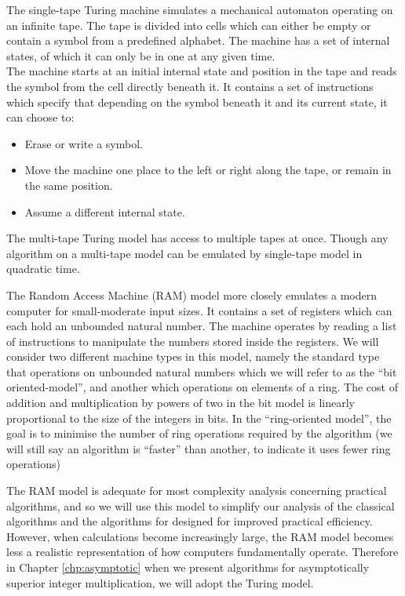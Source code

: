 The single-tape Turing machine simulates a mechanical automaton operating on an infinite tape. The tape is divided into cells which can either be empty or contain a symbol from a predefined alphabet. The machine has a set of internal states, of which it can only be in one at any given time.\\
The machine starts at an initial internal state and position in the tape and reads the symbol from the cell directly beneath it. It contains a set of instructions which specify that depending on the symbol beneath it and its current state, it can choose to:
\begin{itemize}
    \item Erase or write a symbol.
    \item Move the machine one place to the left or right along the tape, or remain in the same position.
    \item Assume a different internal state.
\end{itemize}
The multi-tape Turing model has access to multiple tapes at once. Though any algorithm on a multi-tape model can be emulated by single-tape model in quadratic time\cite{comp-compexity}.

The Random Access Machine (RAM) model more closely emulates a modern computer for small-moderate input sizes. It contains a set of registers which can each hold an unbounded natural number. The machine operates by reading a list of instructions to manipulate the numbers stored inside the registers. We will consider two different machine types in this model, namely the standard type that operations on unbounded natural numbers which we will refer to as the ``bit oriented-model'', and another which operations on elements of a ring. The cost of addition and multiplication by powers of two in the bit model is linearly proportional to the size of the integers in bits. In the ``ring-oriented model'',  the goal is to minimise the number of ring operations required by the algorithm (we will still say an algorithm is ``faster'' than another, to indicate it uses fewer ring operations)

The RAM model is adequate for most complexity analysis concerning practical algorithms, and so we will use this model to simplify our analysis of the classical algorithms and the algorithms for designed for improved practical efficiency. However, when calculations become increasingly large, the RAM model becomes less a realistic representation of how computers fundamentally operate. Therefore in Chapter \ref{chp:asymptotic} when we present algorithms for asymptotically superior integer multiplication, we will adopt the Turing model.

